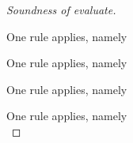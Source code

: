 \begin{proof}[Soundness of evaluate]
{    }

    {
    One rule applies, namely \\
    }

    {One rule applies, namely \\

    }

    {One rule applies, namely \\

    }

    {One rule applies, namely \\

}
\end{proof}
